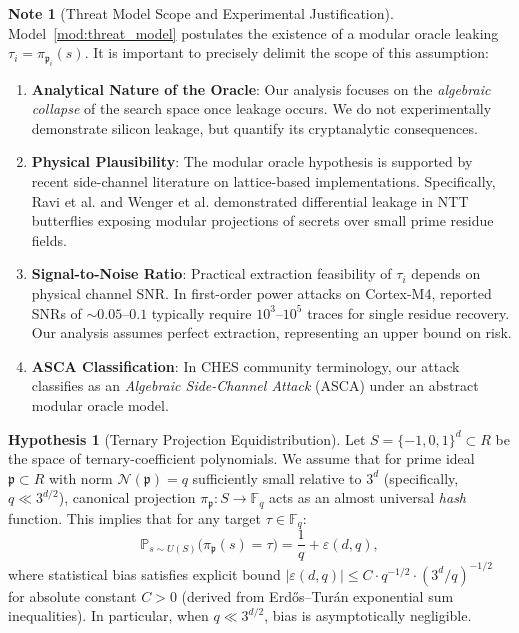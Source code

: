 \documentclass[11pt,a4paper]{article}
\theoremstyle{plain}
\theoremstyle{definition}
\newtheorem{hipotesis}[teorema]{Hypothesis}
\newtheorem{remark}[teorema]{Note}
\numberwithin{equation}{section}
\newcommand{\FF}{\mathbb{F}}
\newcommand{\cN}{\mathcal{N}}
\newcommand{\fkp}{\mathfrak{p}}
\newcommand{\Prob}{\mathbb{P}}
\begin{document}
\begin{remark}[Threat Model Scope and Experimental Justification]
\label{rem:alcance_modelo}
Model~\ref{mod:threat_model} postulates the existence of a modular oracle leaking $\tau_i = \pi_{\fkp_i}(s)$. It is important to precisely delimit the scope of this assumption:
\begin{enumerate}
    \item \textbf{Analytical Nature of the Oracle}: Our analysis focuses on the \emph{algebraic collapse} of the search space once leakage occurs. We do not experimentally demonstrate silicon leakage, but quantify its cryptanalytic consequences.
    \item \textbf{Physical Plausibility}: The modular oracle hypothesis is supported by recent side-channel literature on lattice-based implementations. Specifically, Ravi et al. \cite{Ravi2020} and Wenger et al. \cite{Wenger2024} demonstrated differential leakage in NTT butterflies exposing modular projections of secrets over small prime residue fields.
    \item \textbf{Signal-to-Noise Ratio}: Practical extraction feasibility of $\tau_i$ depends on physical channel SNR. In first-order power attacks on Cortex-M4, reported SNRs of $\sim 0.05$--$0.1$ typically require $10^3$--$10^5$ traces for single residue recovery. Our analysis assumes perfect extraction, representing an upper bound on risk.
    \item \textbf{ASCA Classification}: In CHES community terminology, our attack classifies as an \emph{Algebraic Side-Channel Attack} (ASCA) under an abstract modular oracle model.
\end{enumerate}
\end{remark}

\begin{hipotesis}[Ternary Projection Equidistribution]
\label{hip:equidistribucion}
Let $S = \{-1, 0, 1\}^d \subset R$ be the space of ternary-coefficient polynomials. We assume that for prime ideal $\fkp \subset R$ with norm $\cN(\fkp) = q$ sufficiently small relative to $3^d$ (specifically, $q \ll 3^{d/2}$), canonical projection $\pi_{\fkp}: S \to \FF_q$ acts as an almost universal \emph{hash} function. This implies that for any target $\tau \in \FF_q$:
\begin{equation}
\Prob_{s \sim U(S)} \big( \pi_{\fkp}(s) = \tau \big) = \frac{1}{q} + \varepsilon(d, q),
\end{equation}
where statistical bias satisfies explicit bound $|\varepsilon(d, q)| \le C \cdot q^{-1/2} \cdot (3^d/q)^{-1/2}$ for absolute constant $C > 0$ (derived from Erdős--Turán exponential sum inequalities). In particular, when $q \ll 3^{d/2}$, bias is asymptotically negligible.
\end{hipotesis}
\end{document}
